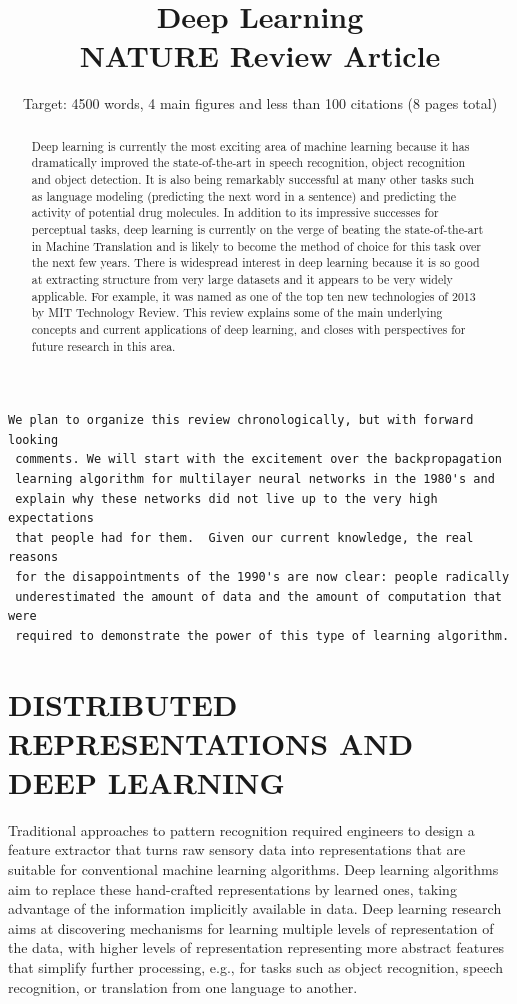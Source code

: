 \documentclass[11pt]{article} %
\title{Deep Learning \\ NATURE Review Article}
\author{Target: 4500 words, 4 main figures and less than 100 citations (8 pages total)}
\begin{document}
\maketitle

\begin{abstract}
Deep learning is currently the most exciting area of machine learning
because it has dramatically improved the state-of-the-art in speech
recognition, object recognition and object detection.  It is also being
remarkably successful at many other tasks such as language modeling
(predicting the next word in a sentence) and predicting the activity of
potential drug molecules.  In addition to its impressive successes for
perceptual tasks, deep learning is currently on the verge of beating the
state-of-the-art in Machine Translation and is likely to become the method
of choice for this task over the next few years.
There is widespread interest in deep learning because it is so good at
extracting structure from very large datasets and it appears to be very
widely applicable. For example, it was named as one of the top ten new
technologies of 2013 by MIT Technology Review. This review explains some
of the main underlying concepts and current applications of deep learning,
and closes with perspectives for future research in this area.
\end{abstract}

\begin{verbatim}
We plan to organize this review chronologically, but with forward looking
 comments. We will start with the excitement over the backpropagation
 learning algorithm for multilayer neural networks in the 1980's and
 explain why these networks did not live up to the very high expectations
 that people had for them.  Given our current knowledge, the real reasons
 for the disappointments of the 1990's are now clear: people radically
 underestimated the amount of data and the amount of computation that were
 required to demonstrate the power of this type of learning algorithm.
\end{verbatim}

\section{DISTRIBUTED REPRESENTATIONS AND DEEP LEARNING}

Traditional approaches to pattern recognition required engineers to design
a feature extractor that turns raw sensory data into representations that
are suitable for conventional machine learning algorithms. Deep learning
algorithms aim to replace these hand-crafted representations by learned
ones, taking advantage of the information implicitly available in
data. Deep learning research aims at discovering mechanisms for learning
multiple levels of representation of the data, with higher levels of
representation representing more abstract features that simplify further
processing, e.g., for tasks such as object recognition, speech recognition,
or translation from one language to another.
\end{document}
